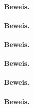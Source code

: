 \documentclass[9pt]{article} %
\begin{document}
\begin{kor}
\paragraph{Beweis.}
\end{kor}
\begin{beob} 
\paragraph{Beweis.}
\end{beob}
\begin{prop}
\paragraph{Beweis.}
\end{prop}
\begin{beob}

\end{beob}
\begin{beob}

\end{beob}
\begin{defi}

\end{defi}
\begin{bem}

\end{bem}
\begin{bem}

\end{bem}
\begin{bsp}

\end{bsp}
\begin{satz}

\paragraph{Beweis.}
\begin{bem}

\end{bem}

\begin{beh}

\end{beh}
\end{satz}
\begin{kor}
\paragraph{Beweis.}
\end{kor}
\begin{defi}

\end{defi}
\begin{satz}
\paragraph{Beweis.}
\end{satz}
\begin{bem}

\end{bem}
\end{document}
